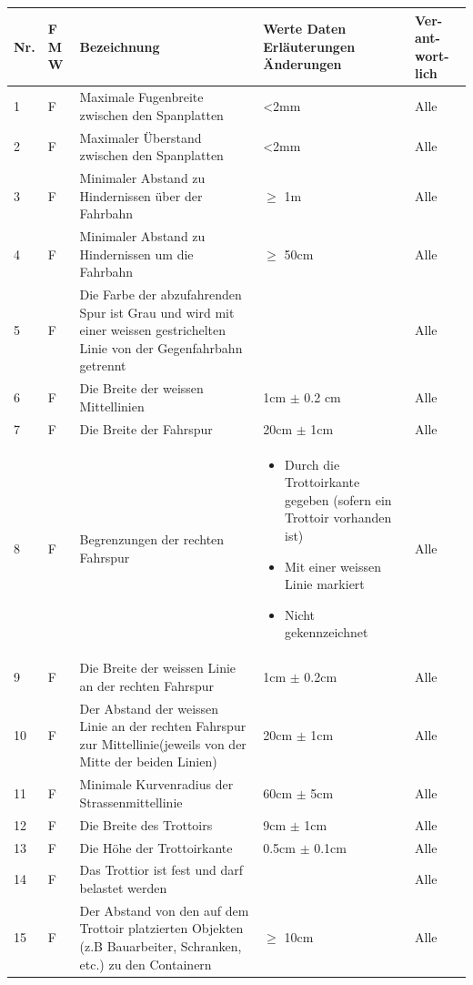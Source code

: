 \begin{center}
\begin{tabular}{|p{1cm}|p{0.5cm}|p{5cm}|p{5cm}|p{1.5cm}|}\hline
\textbf{Nr.} & \textbf{F M W} & \textbf{Bezeichnung} & \textbf{Werte Daten Erläuterungen Änderungen} & \textbf{Ver- ant- wort- lich}\\\hline
 1 & F & Maximale Fugenbreite zwischen den Spanplatten & <2mm & Alle\\\hline
 2 & F & Maximaler Überstand zwischen den Spanplatten & <2mm & Alle\\ \hline
 3 & F & Minimaler Abstand zu Hindernissen über der Fahrbahn &  $\geq$ 1m & Alle\\\hline
 4 & F & Minimaler Abstand zu Hindernissen um die Fahrbahn &  $\geq$ 50cm & Alle\\\hline
  5 & F & Die Farbe der abzufahrenden Spur ist Grau und wird mit einer weissen gestrichelten Linie von der Gegenfahrbahn getrennt &   & Alle\\ \hline
  6 & F & Die Breite der weissen Mittellinien & 1cm $\pm$ 0.2 cm & Alle\\ \hline
  7 & F & Die Breite der Fahrspur &  20cm $\pm$ 1cm & Alle\\ \hline
  8 & F & Begrenzungen der rechten Fahrspur & \begin{itemize} \item Durch die Trottoirkante gegeben (sofern ein Trottoir vorhanden ist)\item Mit einer weissen Linie markiert \item Nicht gekennzeichnet \end{itemize}  & Alle\\ \hline
  9 & F & Die Breite der weissen Linie an der rechten Fahrspur &  1cm $\pm$ 0.2cm & Alle\\ \hline
  10 & F & Der Abstand der weissen Linie an der rechten Fahrspur zur Mittellinie(jeweils von der Mitte der beiden Linien)&  20cm $\pm$ 1cm & Alle\\ \hline
  11 & F & Minimale Kurvenradius der Strassenmittellinie &  60cm $\pm$ 5cm & Alle\\ \hline
  12 & F & Die Breite des Trottoirs &  9cm $\pm$ 1cm & Alle\\ \hline
  13 & F & Die Höhe der Trottoirkante &  0.5cm $\pm$ 0.1cm & Alle\\ \hline
  14 & F & Das Trottior ist fest und darf belastet werden & & Alle\\ \hline
  15 & F & Der Abstand von den auf dem Trottoir platzierten Objekten (z.B Bauarbeiter, Schranken, etc.) zu den Containern & $\geq$ 10cm & Alle\\ \hline

\end{tabular}
\end{center}
